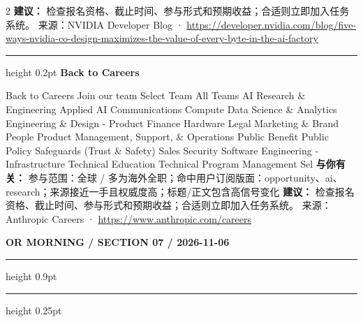 \documentclass[10.5pt]{ctexart}
\begin{document}
\begin{multicols}{2}
\textbf{建议：} 检查报名资格、截止时间、参与形式和预期收益；合适则立即加入任务系统。
{\footnotesize\color{ormuted} 来源：NVIDIA Developer Blog · \url{https://developer.nvidia.com/blog/five-ways-nvidia-co-design-maximizes-the-value-of-every-byte-in-the-ai-factory}}
\vspace{2mm}
\hrule height 0.2pt
\vspace{2mm}
{\large\bfseries Back to Careers}\par
Back to Careers Join our team Select Team All Teams AI Research \& Engineering Applied AI Communications Compute Data Science \& Analytics Engineering \& Design - Product Finance Hardware Legal Marketing \& Brand People Product Management, Support, \& Operations Public Benefit Public Policy Safeguards (Trust \& Safety) Sales Security Software Engineering - Infrastructure Technical Education Technical Program Management Sel
\textbf{与你有关：} 参与范围：全球 / 多为海外全职；命中用户订阅版面：opportunity、ai、research；来源接近一手且权威度高；标题/正文包含高信号变化
\textbf{建议：} 检查报名资格、截止时间、参与形式和预期收益；合适则立即加入任务系统。
{\footnotesize\color{ormuted} 来源：Anthropic Careers · \url{https://www.anthropic.com/careers}}
\end{multicols}
\newpage
{\small\bfseries OR MORNING / SECTION 07 / 2026-11-06}
\vspace{2mm}
\hrule height 0.9pt
\vspace{1.5mm}
\hrule height 0.25pt
\vspace{4mm}
\end{document}
